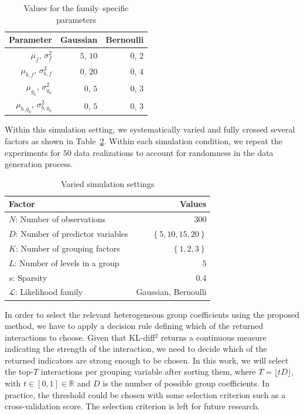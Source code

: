 \documentclass{article}
\begin{document}
\begin{table}[tbp]
  \centering
  \caption{Values for the family--specific parameters}
  \begin{tabular}[tbp]{rrr}
    \toprule
    Parameter & Gaussian & Bernoulli \\
    \midrule
    $\mu_f$, $\sigma^2_f$ & $5$, $10$ & $0$, $2$ \\
    $\mu_{b,f}$, $\sigma^2_{b,f}$ & $0$, $20$ & $0$, $4$ \\
    $\mu_{g_{k}}$, $\sigma^2_{g_{k}}$ & $0$, $5$ & $0$, $3$ \\
    $\mu_{b,g_{k}}$, $\sigma^2_{b,g_{k}}$ & $0$, $5$ & $0$, $3$ \\
    \bottomrule
  \end{tabular}
  \label{tab:family_settings}
\end{table}

%
%
%
%
%
%
%
%
%
%
%
%
%
%
%
%


%
Within this simulation setting, we systematically varied and fully crossed several factors as shown in Table~\ref{tab:settings}.
Within each simulation condition, we repeat the experiments for $50$ data realizations to account for randomness in the data generation process.
%
%


\begin{table}[tbp]
  \centering
    \caption{Varied simulation settings}
  \begin{tabular}[tbp]{lr}
    \toprule
    Factor & Values \\
    \midrule
    $N$: Number of observations & $300$ \\
    $D$: Number of predictor variables & $\left\{ 5, 10, 15, 20 \right\}$ \\
    $K$: Number of grouping factors & $\left\{ 1, 2, 3 \right\}$ \\
    $L$: Number of levels in a group & $5$ \\
    $s$: Sparsity  & $0.4$ \\
    $\mathcal{L}$: Likelihood family & Gaussian, Bernoulli \\
    \bottomrule
  \end{tabular}
  \label{tab:settings}
\end{table}

In order to select the relevant heterogeneous group coefficients using the proposed method, we have to apply a decision rule defining which of the returned interactions to choose.
Given that KL-diff$^2$ returns a continuous measure indicating the strength of the interaction, we need to decide which of the returned indicators are strong enough to be chosen.
In this work, we will select the top-$T$ interactions per grouping variable after sorting them, where $T = \lfloor tD\rfloor$, with $t \in [0, 1] \in \mathbb{R}$ and $D$ is the number of possible group coefficients.
In practice, the threshold could be chosen with some selection criterion such as a cross-validation score. 
The selection criterion is left for future research.
\end{document}
